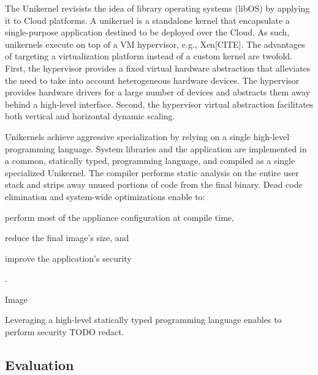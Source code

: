 The Unikernel revisists the idea of library operating systems (libOS) by applying it to Cloud platforms.
A unikernel is a standalone kernel that encapsulate a single-purpose application destined to be deployed over the Cloud.
As such, unikernels execute on top of a VM hypervisor, e.g., Xen[CITE].
The advantages of targeting a virtualization platform instead of a custom kernel are twofold.
First, the hypervisor provides a fixed virtual hardware abstraction that alleviates the need to take into account heterogeneous hardware devices.
The hypervisor provides hardware drivers for a large number of devices and abstracts them away behind a high-level interface.
Second, the hypervisor virtual abstraction facilitates both vertical and horizontal dynamic scaling.


Unikernels achieve aggressive specialization by relying on a single high-level programming language.
System libraries and the application are implemented in a common, statically typed, programming language, and compiled as a single specialized Unikernel.
The compiler performs static analysis on the entire user stack and strips away unused portions of code from the final binary.
Dead code elimination and system-wide optimizations enable to:
\begin{enumerate*}
	\item perform most of the appliance configuration at compile time,
	\item reduce the final image's size, and
	\item improve the application's security
\end{enumerate*}.

Image 

Leveraging a high-level statically typed programming language enables to perform security TODO redact. 




\subsection{Evaluation}
